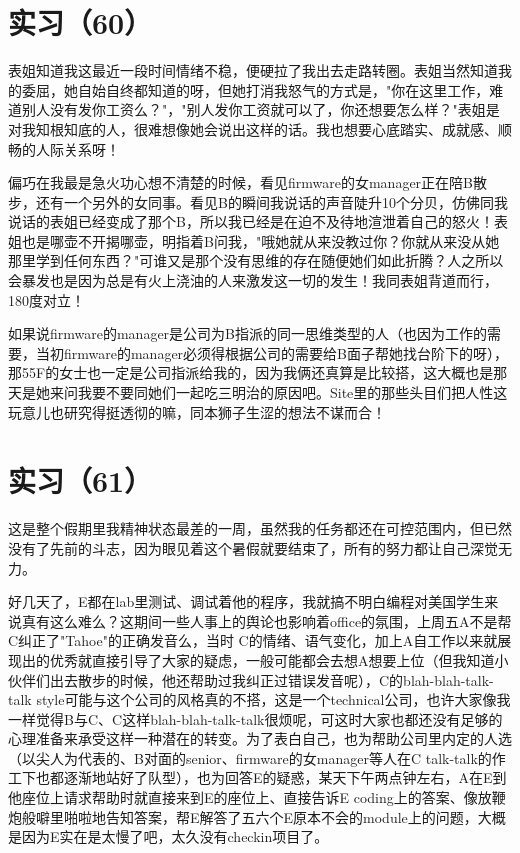 \documentclass[12pt]{book}
\begin{document}
\section{实习（60）　}
\label{sec-5-63}

表姐知道我这最近一段时间情绪不稳，便硬拉了我出去走路转圈。表姐当然知道我的委屈，她自始自终都知道的呀，但她打消我怒气的方式是，"你在这里工作，难道别人没有发你工资么？"，"别人发你工资就可以了，你还想要怎么样？"表姐是对我知根知底的人，很难想像她会说出这样的话。我也想要心底踏实、成就感、顺畅的人际关系呀！

偏巧在我最是急火功心想不清楚的时候，看见firmware的女manager正在陪B散步，还有一个另外的女同事。看见B的瞬间我说话的声音陡升10个分贝，仿佛同我说话的表姐已经变成了那个B，所以我已经是在迫不及待地渲泄着自己的怒火！表姐也是哪壶不开揭哪壶，明指着B问我，"哦她就从来没教过你？你就从来没从她那里学到任何东西？"可谁又是那个没有思维的存在随便她们如此折腾？人之所以会暴发也是因为总是有火上浇油的人来激发这一切的发生！我同表姐背道而行，180度对立！

如果说firmware的manager是公司为B指派的同一思维类型的人（也因为工作的需要，当初firmware的manager必须得根据公司的需要给B面子帮她找台阶下的呀），那55F的女士也一定是公司指派给我的，因为我俩还真算是比较搭，这大概也是那天是她来问我要不要同她们一起吃三明治的原因吧。Site里的那些头目们把人性这玩意儿也研究得挺透彻的嘛，同本狮子生涩的想法不谋而合！　


\section{实习（61）　}
\label{sec-5-64}

这是整个假期里我精神状态最差的一周，虽然我的任务都还在可控范围内，但已然没有了先前的斗志，因为眼见着这个暑假就要结束了，所有的努力都让自己深觉无力。

好几天了，E都在lab里测试、调试着他的程序，我就搞不明白编程对美国学生来说真有这么难么？这期间一些人事上的舆论也影响着office的氛围，上周五A不是帮C纠正了"Tahoe"的正确发音么，当时 C的情绪、语气变化，加上A自工作以来就展现出的优秀就直接引导了大家的疑虑，一般可能都会去想A想要上位（但我知道小伙伴们出去散步的时候，他还帮助过我纠正过错误发音呢），C的blah-blah-talk-talk style可能与这个公司的风格真的不搭，这是一个technical公司，也许大家像我一样觉得B与C、C这样blah-blah-talk-talk很烦呢，可这时大家也都还没有足够的心理准备来承受这样一种潜在的转变。为了表白自己，也为帮助公司里内定的人选（以尖人为代表的、B对面的senior、firmware的女manager等人在C talk-talk的作工下也都逐渐地站好了队型），也为回答E的疑惑，某天下午两点钟左右，A在E到他座位上请求帮助时就直接来到E的座位上、直接告诉E coding上的答案、像放鞭炮般噼里啪啦地告知答案，帮E解答了五六个E原本不会的module上的问题，大概是因为E实在是太慢了吧，太久没有checkin项目了。　
\end{document}
